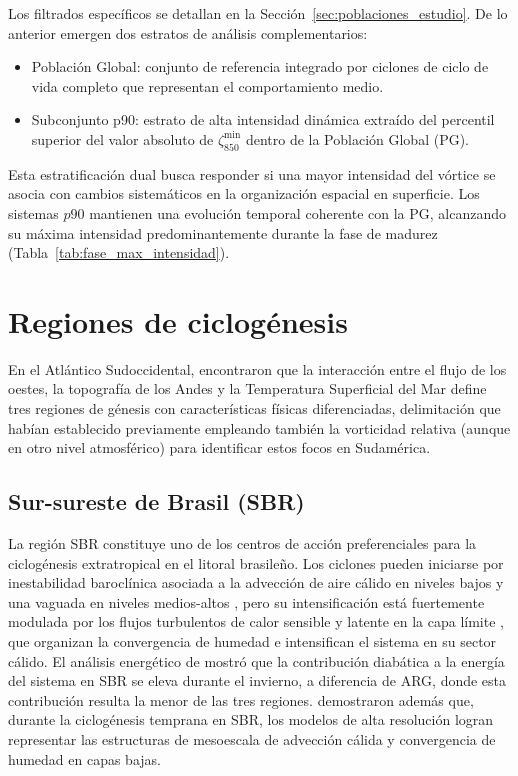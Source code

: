 Los filtrados específicos se detallan en la Sección~\ref{sec:poblaciones_estudio}.
De lo anterior emergen dos estratos de análisis complementarios:
\begin{itemize}
\item Población Global: conjunto de referencia integrado por ciclones de ciclo de vida completo que representan el comportamiento medio.
\item Subconjunto p90: estrato de alta intensidad dinámica extraído del percentil superior del valor absoluto de $\zeta_{850}^{\min}$ dentro de la Población Global (PG).
\end{itemize}
Esta estratificación dual busca responder si una mayor intensidad del vórtice se asocia con cambios sistemáticos en la organización espacial en superficie. 
Los sistemas $p90$ mantienen una evolución temporal coherente con la PG, alcanzando su máxima intensidad predominantemente durante la fase de madurez (Tabla~\ref{tab:fase_max_intensidad}).


\section{Regiones de ciclogénesis}\label{sec:tb_regiones}
En el Atlántico Sudoccidental, \citet{gramcianinov2019properties} encontraron que la interacción entre el flujo de los oestes, la topografía de los Andes \citep{gan1994influence} y la Temperatura Superficial del Mar define tres regiones de génesis con características físicas diferenciadas, delimitación que \citet{reboita2010south} habían establecido previamente empleando también la vorticidad relativa (aunque en otro nivel atmosférico) para identificar estos focos en Sudamérica.

\subsection{Sur-sureste de Brasil (SBR)}\label{subsec:tb_sbr}
La región SBR constituye uno de los centros de acción preferenciales para la ciclogénesis extratropical en el litoral brasileño.
Los ciclones pueden iniciarse por inestabilidad baroclínica asociada a la advección de aire cálido en niveles bajos y una vaguada en niveles medios-altos \citep{gozzo2014subtropical}, pero su intensificación está fuertemente modulada por los flujos turbulentos de calor sensible y latente en la capa límite \citep{gozzo2013air}, que organizan la convergencia de humedad e intensifican el sistema en su sector cálido. 
El análisis energético de \citet{coutodesouza2024thesis} mostró que la contribución diabática a la energía del sistema en SBR se eleva durante el invierno, a diferencia de ARG, donde esta contribución resulta la menor de las tres regiones.
\citet{gramcianinov2024early} demostraron además que, durante la ciclogénesis temprana en SBR, los modelos de alta resolución logran representar las estructuras de mesoescala de advección cálida y convergencia de humedad en capas bajas.

